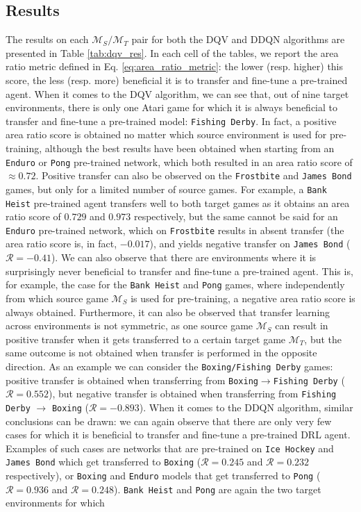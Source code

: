 \subsection{Results}
\label{sec:results_1}

The results on each $\mathcal{M}_S/\mathcal{M}_T$ pair for both the DQV and DDQN algorithms are presented in Table \ref{tab:dqv_res}. In each cell of the tables, we report the area ratio metric defined in Eq. \ref{eq:area_ratio_metric}: the lower (resp. higher) this score, the less (resp. more) beneficial it is to transfer and fine-tune a pre-trained agent. When it comes to the DQV algorithm, we can see that, out of nine target environments, there is only one Atari game for which it is always beneficial to transfer and fine-tune a pre-trained model: \texttt{Fishing Derby}. In fact, a positive area ratio score is obtained no matter which source environment is used for pre-training, although the best results have been obtained when starting from an \texttt{Enduro} or \texttt{Pong} pre-trained network, which both resulted in an area ratio score of $\approx 0.72$. Positive transfer can also be observed on the \texttt{Frostbite} and \texttt{James Bond} games, but only for a limited number of source games. For example, a \texttt{Bank Heist} pre-trained agent transfers well to both target games as it obtains an area ratio score of $0.729$ and $0.973$ respectively, but the same cannot be said for an \texttt{Enduro} pre-trained network, which on \texttt{Frostbite} results in absent transfer (the area ratio score is, in fact, $-0.017$), and yields negative transfer on \texttt{James Bond} ($\mathscr{R}=-0.41$). We can also observe that there are environments where it is surprisingly never beneficial to transfer and fine-tune a pre-trained agent. This is, for example, the case for the \texttt{Bank Heist} and \texttt{Pong} games, where independently from which source game $\mathcal{M}_S$ is used for pre-training, a negative area ratio score is always obtained. Furthermore, it can also be observed that transfer learning across environments is not symmetric, as one source game $\mathcal{M}_S$ can result in positive transfer when it gets transferred to a certain target game $\mathcal{M}_T$, but the same outcome is not obtained when transfer is performed in the opposite direction. As an example we can consider the \texttt{Boxing/Fishing Derby} games: positive transfer is obtained when transferring from \texttt{Boxing}$\rightarrow$\texttt{Fishing Derby} ($\mathscr{R}=0.552$), but negative transfer is obtained when transferring from \texttt{Fishing Derby} $\rightarrow$ \texttt{Boxing} ($\mathscr{R}=-0.893$). When it comes to the DDQN algorithm, similar conclusions can be drawn: we can again observe that there are only very few cases for which it is beneficial to transfer and fine-tune a pre-trained DRL agent. Examples of such cases are networks that are pre-trained on \texttt{Ice Hockey} and \texttt{James Bond} which get transferred to \texttt{Boxing} ($\mathscr{R}=0.245$ and $\mathscr{R}=0.232$ respectively), or \texttt{Boxing} and \texttt{Enduro} models that get transferred to \texttt{Pong} ($\mathscr{R}=0.936$ and $\mathscr{R}=0.248$). \texttt{Bank Heist} and \texttt{Pong} are again the two target environments for which 